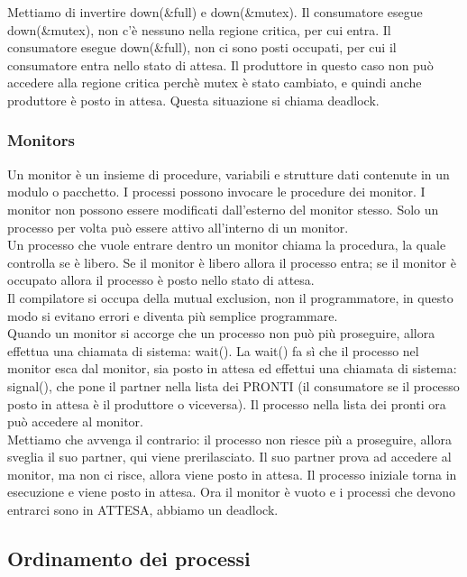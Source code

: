 \documentclass{article}
\begin{document}
Mettiamo di invertire down(\&full) e down(\&mutex). Il consumatore esegue down(\&mutex), non c'è nessuno nella regione critica, per cui entra. Il consumatore esegue down(\&full), non ci sono posti occupati, per cui il consumatore entra nello stato di attesa. Il produttore in questo caso non può accedere alla regione critica perchè mutex è stato cambiato, e quindi anche produttore è posto in attesa. Questa situazione si chiama deadlock.\\

\subsubsection{Monitors}
Un monitor è un insieme di procedure, variabili e strutture dati contenute in un modulo o pacchetto. I processi possono invocare le procedure dei monitor. I monitor non possono essere modificati dall'esterno del monitor stesso. Solo un processo per volta può essere attivo all'interno di un monitor.\\
Un processo che vuole entrare dentro un monitor chiama la procedura, la quale controlla se è libero. Se il monitor è libero allora il processo entra; se il monitor è occupato allora il processo è posto nello stato di attesa.\\
Il compilatore si occupa della mutual exclusion, non il programmatore, in questo modo si evitano errori e diventa più semplice programmare.\\

Quando un monitor si accorge che un processo non può più proseguire, allora effettua una chiamata di sistema: wait(). La wait() fa sì che il processo nel monitor esca dal monitor, sia posto in attesa ed effettui una chiamata di sistema: signal(), che pone il partner nella lista dei PRONTI (il consumatore se il processo posto in attesa è il produttore o viceversa). Il processo nella lista dei pronti ora può accedere al monitor.\\

Mettiamo che avvenga il contrario: il processo non riesce più a proseguire, allora sveglia il suo partner, qui viene prerilasciato. Il suo partner prova ad accedere al monitor, ma non ci risce, allora viene posto in attesa. Il processo iniziale torna in esecuzione e viene posto in attesa. Ora il monitor è vuoto e i processi che devono entrarci sono in ATTESA, abbiamo un deadlock.

\subsection{Ordinamento dei processi}
\end{document}
